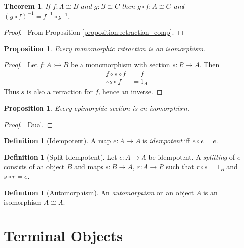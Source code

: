 \documentclass{article}
\let\qed\relax
\newtheorem{proposition}[axiom]{Proposition}
\newtheorem{thm}[axiom]{Theorem}
\theoremstyle{definition}
\newtheorem{definition}[axiom]{Definition}
\newcommand{\inv}[1]{\ensuremath{{#1}^{-1}}}
\begin{document}
\begin{thm}
    If $f : A \cong B$ and $g : B \cong C$ then $g \circ f : A \cong C$ and
    $\inv{(g \circ f)} = \inv{f} \circ \inv{g}$.
\end{thm}

\begin{proof}
    \pf\ From Proposition \ref{proposition:retraction_comp}. \qed
\end{proof}

\begin{proposition}
    Every monomorphic retraction is an isomorphism.
\end{proposition}

\begin{proof}
    \pf\ Let $f : A \rightarrowtail B$ be a monomorphism with section $s : B \rightarrow A$. Then
    \begin{align*}
        f \circ s \circ f & = f \\
        \therefore s \circ f & = 1_A
    \end{align*}
    Thus $s$ is also a retraction for $f$, hence an inverse. \qed
\end{proof}

\begin{proposition}
    Every epimorphic section is an isomorphism.
\end{proposition}

\begin{proof}
    \pf\ Dual. \qed
\end{proof}

\begin{definition}[Idempotent]
    A map $e : A \rightarrow A$ is \emph{idempotent} iff $e \circ e = e$.
\end{definition}

\begin{definition}[Split Idempotent]
    Let $e : A \rightarrow A$ be idempotent. A \emph{splitting} of $e$ consists of an object $B$ and maps
    $s : B \rightarrow A$, $r : A \rightarrow B$ such that $r \circ s = 1_B$ and $s \circ r = e$.
\end{definition}

\begin{definition}[Automorphism]
    An \emph{automorphism} on an object $A$ is an isomorphism $A \cong A$.
\end{definition}

\section{Terminal Objects}
\end{document}
